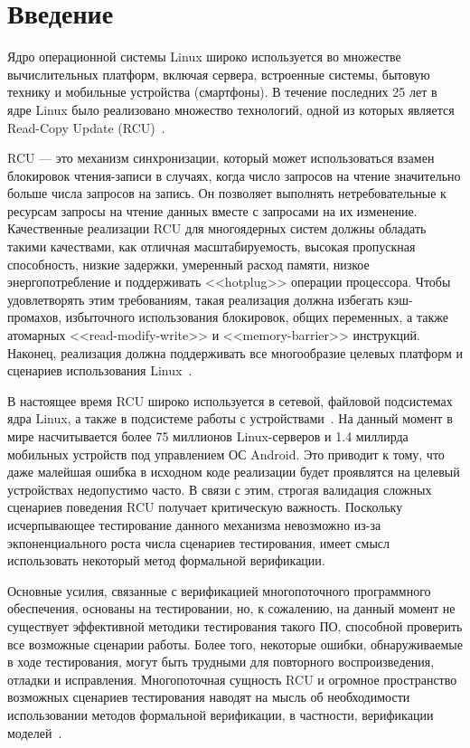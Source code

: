 \section{Введение}
Ядро операционной системы Linux широко используется во множестве
вычислительных платформ, включая сервера, встроенные системы,
бытовую технику и мобильные устройства (смартфоны).
В течение последних 25 лет в ядре Linux было реализовано
множество технологий, одной из которых является
Read-Copy Update (RCU)~\cite{McKenneyRCU98}.

RCU --- это механизм синхронизации, который может использоваться
взамен блокировок чтения-записи в случаях,
когда число запросов на чтение значительно
больше числа запросов на запись.
Он позволяет выполнять нетребовательные к ресурсам запросы на
чтение данных вместе с запросами на их изменение.
Качественные реализации RCU для многоядерных систем
должны обладать такими качествами, как отличная масштабируемость,
высокая пропускная способность, низкие задержки, умеренный расход памяти,
низкое энергопотребление и поддерживать <<hotplug>> операции процессора.
Чтобы удовлетворять этим требованиям,
такая реализация должна избегать кэш-промахов,
избыточного использования блокировок, общих переменных,
а также атомарных <<read-modify-write>> и <<memory-barrier>> инструкций.
Наконец, реализация должна поддерживать все многообразие
целевых платформ и сценариев использования Linux~\cite{McKenneyOSR08}.

В настоящее время RCU широко используется в сетевой, файловой подсистемах
ядра Linux, а также в подсистеме работы с
устройствами~\cite{McKenneyOSR08,McKenneyRCUsageReport13}.
На данный момент в мире насчитывается более 75 миллионов
Linux-серверов и 1.4 миллирда мобильных устройств под управлением ОС Android.
Это приводит к тому, что даже малейшая ошибка в исходном коде
реализации будет проявлятся на целевый устройствах недопустимо часто.
В связи с этим, строгая валидация сложных сценариев поведения RCU получает
критическую важность. Поскольку исчерпывающее тестирование данного
механизма невозможно из-за экпоненциального роста числа сценариев тестирования,
имеет смысл использовать некоторый метод формальной верификации.

Основные усилия, связанные с верификацией многопоточного программного
обеспечения, основаны на тестировании, но, к сожалению,
на данный момент не существует эффективной методики тестирования такого ПО,
способной проверить все возможные сценарии работы.
Более того, некоторые ошибки, обнаруживаемые в ходе тестирования,
могут быть трудными для повторного воспроизведения, отладки и исправления.
Многопоточная сущность RCU и огромное пространство возможных сценариев
тестирования наводят на мысль об необходимости использовании
методов формальной верификации,
в частности, верификации моделей~\cite{BurchInfComput92}.

